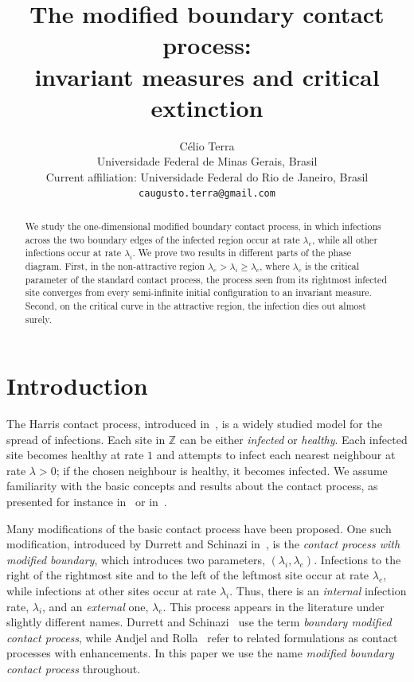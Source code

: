 \documentclass[11pt,a4paper]{article}
\title{The modified boundary contact process:\\
invariant measures and critical extinction}
\author{Célio Terra\\[0.4em]
\small Universidade Federal de Minas Gerais, Brasil\\
\small Current affiliation: Universidade Federal do Rio de Janeiro, Brasil\\
\small \texttt{caugusto.terra@gmail.com}}
\date{}
\theoremstyle{plain}
\theoremstyle{definition}
\theoremstyle{remark}
\numberwithin{equation}{section}
\begin{document}
\maketitle
\thispagestyle{plain}

\begin{abstract}
\noindent
We study the one-dimensional modified boundary contact process, in which infections across the two boundary edges of the infected region occur at rate \(\lambda_e\), while all other infections occur at rate \(\lambda_i\). We prove two results in different parts of the phase diagram. First, in the non-attractive region $\lambda_e>\lambda_i\geq\lambda_c$, where $\lambda_c$ is the critical parameter of the standard contact process, the process seen from its rightmost infected site converges from every semi-infinite initial configuration to an invariant measure. Second, on the critical curve in the attractive region, the infection dies out almost surely.
\end{abstract}

\smallskip

\section{Introduction}
	The Harris contact process, introduced in~\cite{Harris74}, is a widely studied model for the spread of infections. Each site in $\mathbb{Z}$ can be either \emph{infected} or \emph{healthy}. Each infected site becomes healthy at rate $1$ and attempts to infect each nearest neighbour at rate $\lambda>0$; if the chosen neighbour is healthy, it becomes infected. We assume familiarity with the basic concepts and results about the contact process, as presented for instance in~\cite[Chapter VI]{Liggett05} or in~\cite{Valesin2024}.
	
	
	Many modifications of the basic contact process have been proposed. One such modification, introduced by Durrett and Schinazi in~\cite{DurrettSchinazi00}, is the \emph{contact process with modified boundary}, which introduces two parameters, $(\lambda_i, \lambda_e)$. Infections to the right of the rightmost site and to the left of the leftmost site occur at rate $\lambda_e$, while infections at other sites occur at rate $\lambda_i$. Thus, there is an \emph{internal} infection rate, $\lambda_i$, and an \emph{external} one, $\lambda_e$. This process appears in the literature under slightly different names. Durrett and Schinazi~\cite{DurrettSchinazi00} use the term \emph{boundary modified contact process}, while Andjel and Rolla~\cite{AndjelRolla23} refer to related formulations as contact processes with enhancements. In this paper we use the name \emph{modified boundary contact process} throughout.
	
\end{document}
